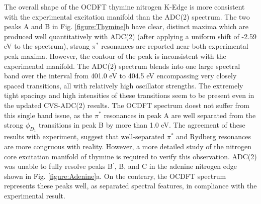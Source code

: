 \documentclass[12pt]{article}
\begin{document}
The overall shape of the OCDFT thymine nitrogen K-Edge is more consistent with the experimental excitation manifold than the ADC(2) spectrum. The two peaks A and B in Fig. \ref{figure:Thymine}b have clear, distinct maxima which are produced well quantitatively with ADC(2) (after applying a uniform shift of -2.59 eV to the spectrum), strong $\pi^*$ resonances are reported near both experimental peak maxima. However, the contour of the peak is inconsistent with the experimental manifold. The ADC(2) spectrum blends into one large spectral band over the interval from 401.0 eV to 404.5 eV encompassing very closely spaced transitions, all with relatively high oscillator strengths. The extremely tight spacings and high intensities of these transitions seem to be present even in the updated CVS-ADC(2) results. The OCDFT spectrum doest not suffer from this single band issue, as the $\pi^*$ resonances in peak A are well separated from the strong $\phi_{D_1}$ transitions in peak B by more than 1.0 eV. The agreement of these results with experiment, suggest that well-separated $\pi^*$ and Rydberg resonances are more congruous with reality. However, a more detailed study of the nitrogen core excitation manifold of thymine is required to verify this observation.
ADC(2) was unable to fully resolve peaks B$^{\prime}$, B, and C in the adenine nitrogen edge shown in Fig. \ref{figure:Adenine}a. On the contrary, the OCDFT spectrum represents these peaks well, as separated spectral features, in compliance with the experimental result. 
\end{document}
